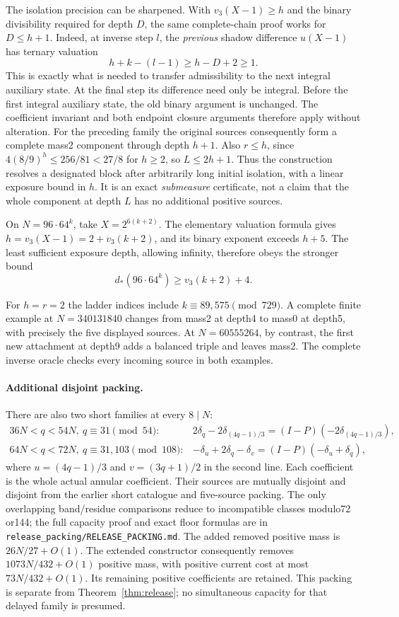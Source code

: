\documentclass[11pt]{article}
\begin{document}
The isolation precision can be sharpened. With $v_3(X-1)\ge h$ and
the binary divisibility required for depth $D$, the same complete-chain
proof works for $D\le h+1$. Indeed, at inverse step $l$, the
\emph{previous} shadow difference $u(X-1)$ has ternary valuation
\[
 h+k-(l-1)\ge h-D+2\ge1.
\]
This is exactly what is needed to transfer admissibility to the next
integral auxiliary state. At the final step its difference need only
be integral. Before the first integral auxiliary state, the old binary
argument is unchanged. The coefficient invariant and both endpoint
closure arguments therefore apply without alteration.
For the preceding family the original sources consequently form a
complete mass2 component through depth $h+1$. Also $r\le h$, since
$4(8/9)^h\le256/81<27/8$ for $h\ge2$, so $L\le2h+1$.
Thus the construction resolves a designated block after arbitrarily
long initial isolation, with a linear exposure bound in $h$. It is an exact
\emph{submeasure} certificate, not a claim that the whole component
at depth $L$ has no additional positive sources.

On $N=96\cdot64^k$, take $X=2^{6(k+2)}$.
The elementary valuation formula gives
$h=v_3(X-1)=2+v_3(k+2)$, and its binary exponent exceeds $h+5$.
The least sufficient exposure depth, allowing infinity, therefore obeys
the stronger bound
\[
 d_*(96\cdot64^k)\ge v_3(k+2)+4.
\]

For $h=r=2$ the ladder indices include $k\equiv89,575\pmod{729}$.
A complete finite example at $N=340131840$ changes from mass2 at
depth4 to mass0 at depth5, with precisely the five displayed sources.
At $N=60555264$, by contrast, the first new attachment at depth9
adds a balanced triple and leaves mass2. The complete inverse oracle
checks every incoming source in both examples.

\paragraph{Additional disjoint packing.}
There are also two short families at every $8\mid N$:
\[
 \begin{array}{ll}
 36N<q<54N,\ q\equiv31\pmod{54}:&
 2\delta_q-2\delta_{(4q-1)/3}
       =(I-P)(-2\delta_{(4q-1)/3}),\\[2pt]
 64N<q<72N,\ q\equiv31,103\pmod{108}:&
 -\delta_u+2\delta_q-\delta_v=(I-P)(-\delta_u+\delta_q),
 \end{array}
\]
where $u=(4q-1)/3$ and $v=(3q+1)/2$ in the second line.
Each coefficient is the whole actual annular coefficient. Their
sources are mutually disjoint and disjoint from the earlier short
catalogue and five-source packing. The only overlapping band/residue
comparisons reduce to incompatible classes modulo72 or144; the full
capacity proof and exact floor formulas are in
\texttt{release\_packing/RELEASE\_PACKING.md}.
The added removed positive mass is $26N/27+O(1)$.
The extended constructor consequently removes
$1073N/432+O(1)$ positive mass, with positive current cost at most
$73N/432+O(1)$. Its remaining positive coefficients are retained.
This packing is separate from Theorem~\ref{thm:release}; no simultaneous
capacity for that delayed family is presumed.
\end{document}
